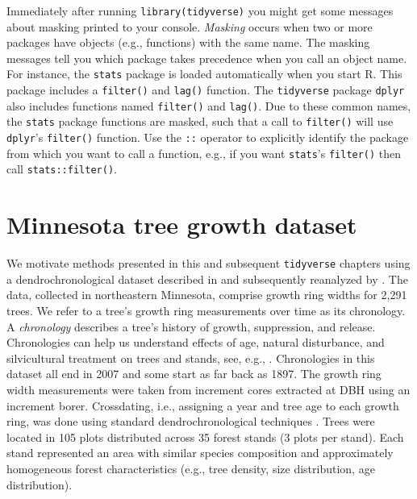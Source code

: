 \documentclass[
  11pt,
]{krantz}
\theoremstyle{definition}
\theoremstyle{definition}
\theoremstyle{definition}
\theoremstyle{definition}
\theoremstyle{remark}
\begin{document}
Immediately after running \texttt{library(tidyverse)} you might get some messages about masking printed to your console. \emph{Masking} occurs when two or more packages have objects (e.g., functions) with the same name. The masking messages tell you which package takes precedence when you call an object name. For instance, the \texttt{stats} package is loaded automatically when you start R. This package includes a \texttt{filter()} and \texttt{lag()} function. The \texttt{tidyverse} package \texttt{dplyr} also includes functions named \texttt{filter()} and \texttt{lag()}. Due to these common names, the \texttt{stats} package functions are masked, such that a call to \texttt{filter()} will use \texttt{dplyr}'s \texttt{filter()} function. Use the \texttt{::} operator to explicitly identify the package from which you want to call a function, e.g., if you want \texttt{stats}'s \texttt{filter()} then call \texttt{stats::filter()}.

\hypertarget{minnesota}{%
\section{Minnesota tree growth dataset}\label{minnesota}}

We motivate methods presented in this and subsequent \texttt{tidyverse} chapters using a dendrochronological dataset described in \citet{foster14} and subsequently reanalyzed by \citet{itter2017}. The data, collected in northeastern Minnesota, comprise growth ring widths for 2,291 trees. We refer to a tree's growth ring measurements over time as its chronology. A \emph{chronology} describes a tree's history of growth, suppression, and release. Chronologies can help us understand effects of age, natural disturbance, and silvicultural treatment on trees and stands, see, e.g., \citet{itter2017}. Chronologies in this dataset all end in 2007 and some start as far back as 1897. The growth ring width measurements were taken from increment cores extracted at DBH using an increment borer. Crossdating, i.e., assigning a year and tree age to each growth ring, was done using standard dendrochronological techniques \citep[see, e.g.,][ for crossdating methods and R tools]{bunn2010}. Trees were located in 105 plots distributed across 35 forest stands (3 plots per stand). Each stand represented an area with similar species composition and approximately homogeneous forest characteristics (e.g., tree density, size distribution, age distribution).
\end{document}
